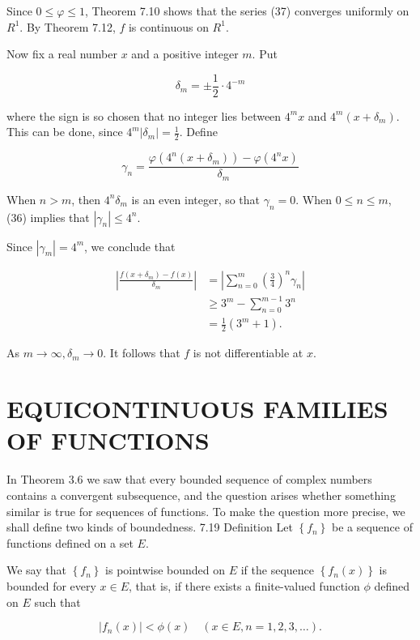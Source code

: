 \documentclass[10pt]{article}
\begin{document}
Since $0 \leq \varphi \leq 1$, Theorem 7.10 shows that the series (37) converges uniformly on $R^{1}$. By Theorem 7.12, $f$ is continuous on $R^{1}$.

Now fix a real number $x$ and a positive integer $m$. Put

$$
\delta_{m}= \pm \frac{1}{2} \cdot 4^{-m}
$$

where the sign is so chosen that no integer lies between $4^{m} x$ and $4^{m}\left(x+\delta_{m}\right)$. This can be done, since $4^{m}\left|\delta_{m}\right|=\frac{1}{2}$. Define

$$
\gamma_{n}=\frac{\varphi\left(4^{n}\left(x+\delta_{m}\right)\right)-\varphi\left(4^{n} x\right)}{\delta_{m}}
$$

When $n>m$, then $4^{n} \delta_{m}$ is an even integer, so that $\gamma_{n}=0$. When $0 \leq n \leq m$, (36) implies that $\left|\gamma_{n}\right| \leq 4^{n}$.

Since $\left|\gamma_{m}\right|=4^{m}$, we conclude that

$$
\begin{aligned}
\left|\frac{f\left(x+\delta_{m}\right)-f(x)}{\delta_{m}}\right| & =\left|\sum_{n=0}^{m}\left(\frac{3}{4}\right)^{n} \gamma_{n}\right| \\
& \geq 3^{m}-\sum_{n=0}^{m-1} 3^{n} \\
& =\frac{1}{2}\left(3^{m}+1\right) .
\end{aligned}
$$

As $m \rightarrow \infty, \delta_{m} \rightarrow 0$. It follows that $f$ is not differentiable at $x$.

\section{EQUICONTINUOUS FAMILIES OF FUNCTIONS}
In Theorem 3.6 we saw that every bounded sequence of complex numbers contains a convergent subsequence, and the question arises whether something similar is true for sequences of functions. To make the question more precise, we shall define two kinds of boundedness. 7.19 Definition Let $\left\{f_{n}\right\}$ be a sequence of functions defined on a set $E$.

We say that $\left\{f_{n}\right\}$ is pointwise bounded on $E$ if the sequence $\left\{f_{n}(x)\right\}$ is bounded for every $x \in E$, that is, if there exists a finite-valued function $\phi$ defined on $E$ such that

$$
\left|f_{n}(x)\right|<\phi(x) \quad(x \in E, n=1,2,3, \ldots) .
$$
\end{document}
